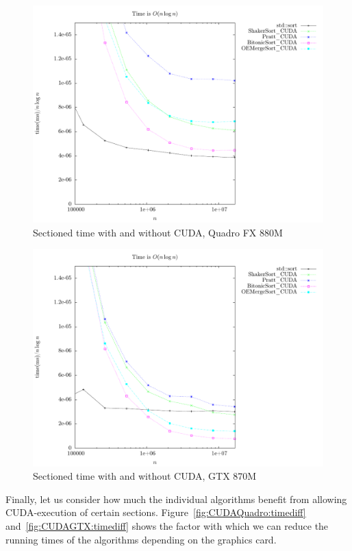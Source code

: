 \begin{figure}
\center
\includegraphics[width=\textwidth]{graphs/CUDA/cudatime.pdf}
\caption{Sectioned time with and without CUDA, Quadro FX 880M}
\label{fig:CUDAQuadro:cudatime}
\end{figure}

\begin{figure}
\center
\includegraphics[width=\textwidth]{graphs/CUDAHueg/cudatime.pdf}
\caption{Sectioned time with and without CUDA, GTX 870M}
\label{fig:CUDAGTX:cudatime}
\end{figure}

Finally, let us consider how much the individual algorithms benefit from allowing CUDA-execution of certain sections. Figure~\ref{fig:CUDAQuadro:timediff} and~\ref{fig:CUDAGTX:timediff} shows the factor with which we can reduce the running times of the algorithms depending on the graphics card.

